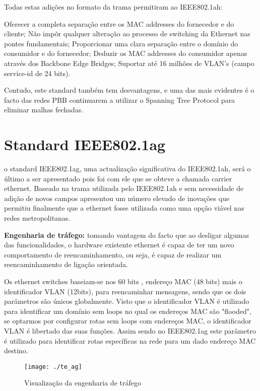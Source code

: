 \documentclass[a4paper]{IEEEtran}
\begin{document}
Todas estas adições no formato da trama permitiram ao IEEE802.1ah:

Oferecer a completa separação entre os MAC addresses do fornecedor e do cliente;
Não impõr qualquer alteração ao processo de switching da Ethernet nas pontes fundamentais;
Proporcionar uma clara separação entre o domínio do consumidor e do fornecedor;
Deduzir os MAC addresses do consumidor apenas através dos Backbone Edge Bridges;
Suportar até 16 milhões de VLAN’s (campo service-id de 24 bits).

Contudo, este standard também tem desvantagens, e uma das mais evidentes é o facto das redes PBB continuarem a utilizar o Spanning Tree Protocol para eliminar malhas fechadas.


\section{Standard IEEE802.1ag}
\label{sec:802.1ag}

o standard IEEE802.1ag, uma actualização significativa do IEEE802.1ah, será o último a ser apresentado pois foi com ele que se obteve a chamada carrier ethernet. Baseado na trama utilizada pelo IEEE802.1ah e sem necessidade de adição de novos campos apresentou um número elevado de inovações que permitiu finalmente que a ethernet fosse utilizada como uma opção viável nas redes metropolitanas.

\textbf{Engenharia de tráfego:} tomando vantagem do facto que ao desligar algumas das funcionalidades, o hardware existente ethernet é capaz de ter um novo comportamento de reencaminhamento, ou seja, é capaz de realizar um reencaminhamento de ligação orientada.

Os ethernet switches baseiam-se nos 60 bits , endereço MAC (48 bits) mais o identificador VLAN (12bits), para reencaminhar mensagens, sendo que os dois parâmetros são únicos globalmente. Visto que  o identificador VLAN é utilizado para identificar um domínio sem loops no qual os endereços MAC são "flooded", se optarmos por configurar rotas sem loops com endereços MAC, o identificador VLAN é libertado das suas funções. Assim sendo no IEEE802.1ag este parâmetro é utilizado para identificar rotas específicas na rede para um dado endereço MAC destino.

\begin{figure}[htp]
	\centering
	\texttt{[image: ./te\_ag]}
	\caption{Visualização da engenharia de tráfego}
	\label{fig:te_ag}
\end{figure}
\end{document}

